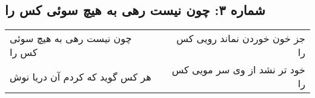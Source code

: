\begin{center}
\section*{شماره ۳: چون نیست رهی به هیچ سوئی کس را}
\label{sec:003}
\begin{longtable}{l p{0.5cm} r}
چون نیست رهی به هیچ سوئی کس را
&&
جز خون خوردن نماند رویی کس را
\\
هر کس گوید که کردم آن دریا نوش
&&
خود تر نشد از وی سر مویی کس را
\\
\end{longtable}
\end{center}
